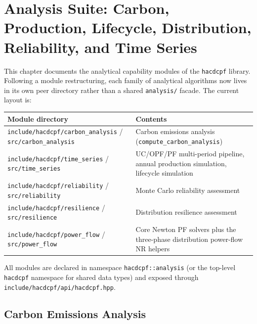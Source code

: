 \section{Analysis Suite: Carbon, Production, Lifecycle, Distribution, Reliability, and Time Series}
\label{sec:analysis}

This chapter documents the analytical capability modules of the
\texttt{hacdcpf} library.  Following a module restructuring, each family of
analytical algorithms now lives in its own peer directory rather than a shared
\texttt{analysis/} facade.  The current layout is:

\begin{center}
\begin{tabular}{ll}
\hline\hline
\textbf{Module directory} & \textbf{Contents} \\
\hline
\texttt{include/hacdcpf/carbon\_analysis} / \texttt{src/carbon\_analysis} & Carbon emissions analysis (\texttt{compute\_carbon\_analysis}) \\
\texttt{include/hacdcpf/time\_series} / \texttt{src/time\_series} & UC/OPF/PF multi-period pipeline, annual production simulation, lifecycle simulation \\
\texttt{include/hacdcpf/reliability} / \texttt{src/reliability} & Monte Carlo reliability assessment \\
\texttt{include/hacdcpf/resilience} / \texttt{src/resilience} & Distribution resilience assessment \\
\texttt{include/hacdcpf/power\_flow} / \texttt{src/power\_flow} & Core Newton PF solvers plus the three-phase distribution power-flow NR helpers \\
\hline\hline
\end{tabular}
\end{center}

All modules are declared in namespace \texttt{hacdcpf::analysis} (or the
top-level \texttt{hacdcpf} namespace for shared data types) and exposed
through \texttt{include/hacdcpf/api/hacdcpf.hpp}.

\subsection{Carbon Emissions Analysis}
\label{sec:carbon}

